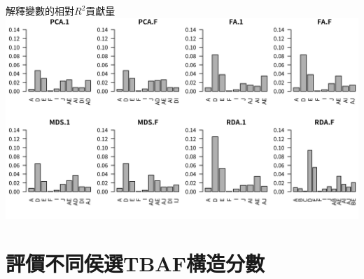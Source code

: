 \documentclass[10pt, aspectratio=1610, xcolor=table]{beamer}
\begin{document}
%
%
%


\begin{frame}{解釋變數的相對$R^2$貢獻量}
\includegraphics[width=1\textwidth]{beta相對貢獻量.png}
\end{frame}

\section{評價不同侯選TBAF構造分數}
\end{document}
